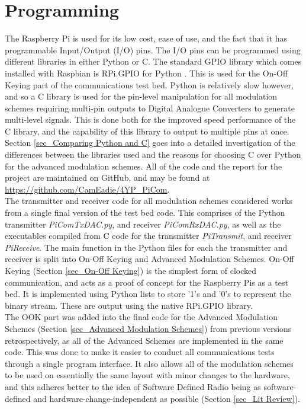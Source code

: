 \documentclass[../main.tex]{subfiles}
\begin{document}
\section{Programming}

The Raspberry Pi is used for its low cost, ease of use, and the fact that it has programmable Input/Output (I/O) pins.
The I/O pins can be programmed using different libraries in either Python or C.
The standard GPIO library which comes installed with Raspbian is RPi.GPIO for Python \cite{lib_RPi.GPIO}.
This is used for the On-Off Keying part of the communications test bed.
Python is relatively slow however, and so a C library is used for the pin-level manipulation for all modulation schemes requiring multi-pin outputs to Digital Analogue Converters to generate multi-level signals.
This is done both for the improved speed performance of the C library, and the capability of this library to output to multiple pins at once.
Section \ref{sec_Comparing Python and C} goes into a detailed  investigation of the differences between the libraries used and the reasons for choosing C over Python for the advanced modulation schemes.
All of the code and the report for the project are maintained on GitHub, and may be found at \url{https://github.com/CamEadie/4YP_PiCom}.\\

The transmitter and receiver code for all modulation schemes considered works from a single final version of the test bed code.
This comprises of the Python transmitter \textit{PiComTx\textunderscore DAC.py}, and receiver \textit{PiComRx\textunderscore DAC.py}, as well as the executables compiled from C code for the transmitter \textit{PiTransmit}, and receiver \textit{PiReceive}.
The main function in the Python files for each the transmitter and receiver is split into On-Off Keying and Advanced Modulation Schemes.
On-Off Keying (Section \ref{sec_On-Off Keying}) is the simplest form of clocked communication, and acts as a proof of concept for the Raspberry Pis as a test bed.
It is implemented using Python lists to store '1's and '0's to represent the binary stream.
These are output using the native RPi.GPIO library.\\

The OOK part was added into the final code for the Advanced Modulation Schemes (Section \ref{sec_Advanced Modulation Schemes})  from previous versions retrospectively, as all of the Advanced Schemes are implemented in the same code.
This was done to make it easier to conduct all communications tests through a single program interface.
It also allows all of the modulation schemes to be used on essentially the same layout with minor changes to the hardware, and this adheres better to the idea of Software Defined Radio being as software-defined and hardware-change-independent as possible (Section \ref{sec_Lit Review}).\\
\end{document}
